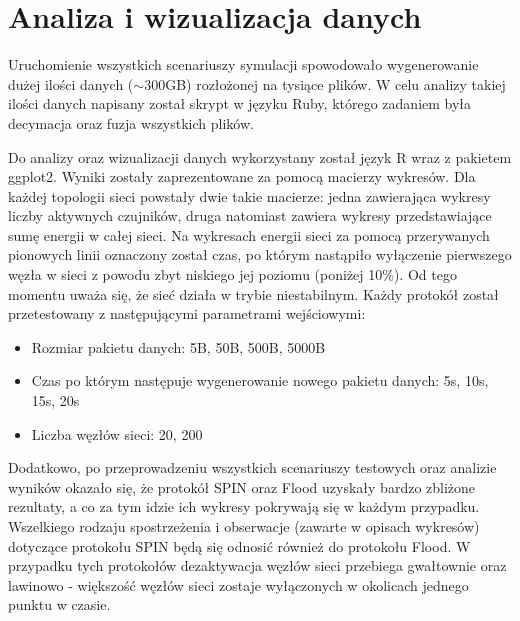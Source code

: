 \section{Analiza i wizualizacja danych}
Uruchomienie wszystkich scenariuszy symulacji spowodowało wygenerowanie dużej ilości danych ($\sim$300GB) rozłożonej na tysiące plików. W celu analizy takiej ilości danych napisany został skrypt w języku Ruby, którego zadaniem była decymacja oraz fuzja wszystkich plików.

Do analizy oraz wizualizacji danych wykorzystany został język R wraz z pakietem ggplot2. Wyniki zostały zaprezentowane za pomocą macierzy wykresów. Dla każdej topologii sieci powstały dwie takie macierze: jedna zawierająca wykresy liczby aktywnych czujników, druga natomiast zawiera wykresy przedstawiające sumę energii w całej sieci. Na wykresach energii sieci za pomocą przerywanych pionowych linii oznaczony został czas, po którym nastąpiło wyłączenie pierwszego węzła w sieci z powodu zbyt niskiego jej poziomu (poniżej 10\%). Od tego momentu uważa się, że sieć działa w trybie niestabilnym.
Każdy protokół został przetestowany z następującymi parametrami wejściowymi:
\begin{itemize}
	\item Rozmiar pakietu danych: 5B, 50B, 500B, 5000B
	\item Czas po którym następuje wygenerowanie nowego pakietu danych: 5s, 10s, 15s, 20s
	\item Liczba węzłów sieci: 20, 200
\end{itemize}

Dodatkowo, po przeprowadzeniu wszystkich scenariuszy testowych oraz analizie wyników okazało się, że protokół SPIN oraz Flood uzyskały bardzo zbliżone rezultaty, a co za tym idzie ich wykresy pokrywają się w każdym przypadku. Wszelkiego rodzaju spostrzeżenia i obserwacje (zawarte w opisach wykresów) dotyczące protokołu SPIN będą się odnosić również do protokołu Flood. 
W przypadku tych protokołów dezaktywacja węzłów sieci przebiega gwałtownie oraz lawinowo - większość węzłów sieci zostaje wyłączonych w okolicach jednego punktu w czasie.


